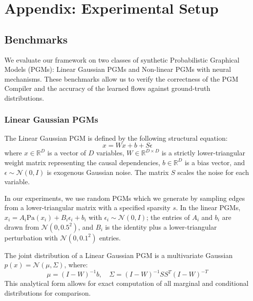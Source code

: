 \newpage
\section{Appendix: Experimental Setup}
\label{app:experiments}

\subsection{Benchmarks}
\label{sec:benchmarks}

We evaluate our framework on two classes of synthetic Probabilistic Graphical Models (PGMs): Linear Gaussian PGMs and Non-linear PGMs with neural mechanisms. These benchmarks allow us to verify the correctness of the PGM Compiler and the accuracy of the learned flows against ground-truth distributions.

\subsubsection{Linear Gaussian PGMs}
The Linear Gaussian PGM is defined by the following structural equation:
\begin{equation}
    x = Wx + b + S\epsilon
\end{equation}
where $x \in \mathbb{R}^D$ is a vector of $D$ variables, $W \in \mathbb{R}^{D \times D}$ is a strictly lower-triangular weight matrix representing the causal dependencies, $b \in \mathbb{R}^D$ is a bias vector, and $\epsilon \sim \mathcal{N}(0, I)$ is exogenous Gaussian noise. The matrix $S$ scales the noise for each variable.

In our experiments, we use random PGMs which we generate by sampling edges from a lower-triangular matrix with a specified sparsity $s$. In the linear PGMs, $x_i = A_i \mathrm{Pa}(x_i) + B_i \epsilon_i + b_i$ with $\epsilon_i \sim \mathcal{N}(0, I)$; the entries of $A_i$ and $b_i$ are drawn from $\mathcal{N}(0, 0.5^2)$, and $B_i$ is the identity plus a lower-triangular perturbation with $\mathcal{N}(0, 0.1^2)$ entries.

The joint distribution of a Linear Gaussian PGM is a multivariate Gaussian $p(x) = \mathcal{N}(\mu, \Sigma)$, where:
\begin{equation}
    \mu = (I-W)^{-1}b, \quad \Sigma = (I-W)^{-1} SS^T (I-W)^{-T}
\end{equation}
This analytical form allows for exact computation of all marginal and conditional distributions for comparison.

